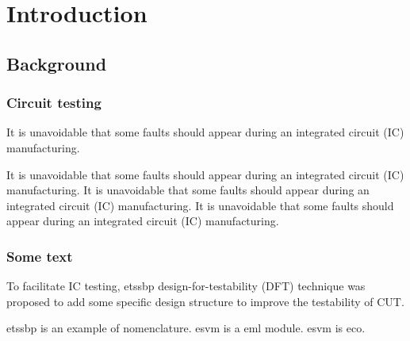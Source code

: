 \chapter{Introduction}
\section{Background}
\subsection{Circuit testing}
It is unavoidable that some faults should appear during an integrated circuit (IC) manufacturing.


\begin{center}
    It is unavoidable that some faults should appear during an integrated circuit
    (IC) manufacturing. It is unavoidable that some faults should appear during an
    integrated circuit (IC) manufacturing. It is unavoidable that some faults
    should appear during an integrated circuit (IC) manufacturing.
\end{center}

\subsection{Some text}

To facilitate IC testing, \gls{etssbp} design-for-testability (DFT) technique was proposed to add some specific design structure to improve the testability of CUT\cite{heuthesis2017,cnarticlet}.

\gls{etssbp} is an example of nomenclature. \gls{esvm} is a \gls{eml} module. \gls{esvm} is \gls{eco}.

